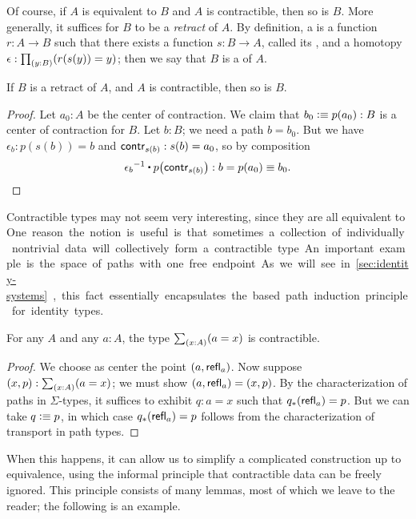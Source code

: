 Of course, if $A$ is equivalent to $B$ and $A$ is contractible, then so is $B$.
More generally, it suffices for $B$ to be a \emph{retract} of $A$.
By definition, a  is a function $r : A \to B$ such that there exists a function $s : B \to A$, called its , and a homotopy $\epsilon:\prd{y:B} (r(s(y))=y)$; then we say that $B$ is a  of $A$.

\begin{lem}\label{thm:retract-contr}
  If $B$ is a retract of $A$, and $A$ is contractible, then so is $B$.
\end{lem}
\begin{proof}
  Let $a_0 : A$ be the center of contraction.
  We claim that $b_0 \vcentcolon\equiv p(a_0) : B$ is a center of contraction for $B$.
  Let $b : B$; we need a path $b = b_0$.
  But we have $\epsilon_b : p(s(b)) = b$ and $\mathsf{contr}_{s(b)} : s(b) = a_0$, so by composition
  \[ \opp{\epsilon_b} \ct \ap{p}{\contr_{s(b)}} : b = p(a_0) \jdeq b_0 . \qedhere\]
\end{proof}

Contractible types may not seem very interesting, since they are all equivalent to \unit.
One reason the notion is useful is that sometimes a collection of individually nontrivial data will collectively form a contractible type.
An important example is the space of paths with one free endpoint.
As we will see in \autoref{sec:identity-systems}, this fact essentially
encapsulates the based path induction principle for identity types.

\begin{lem}\label{thm:contr-paths}
  For any $A$ and any $a:A$, the type $\sm{x:A} (a=x)$ is contractible.
\end{lem}
\begin{proof}
  We choose as center the point $(a,\mathsf{refl}_{a})$.
  Now suppose $(x,p):\sm{x:A}(a=x)$; we must show $(a,\mathsf{refl}_{a}) = (x,p)$.
  By the characterization of paths in $\Sigma$-types, it suffices to exhibit $q:a=x$ such that ${q}_{*}\mathopen{}\left({\mathsf{refl}_{a}}\right)\mathclose{} = p$.
  But we can take $q\vcentcolon\equiv p$, in which case ${q}_{*}\mathopen{}\left({\mathsf{refl}_{a}}\right)\mathclose{} = p$ follows from the characterization of transport in path types.
\end{proof}

When this happens, it can allow us to simplify a complicated construction up to equivalence, using the informal principle that contractible data can be freely ignored.
This principle consists of many lemmas, most of which we leave to the reader; the following is an example.

